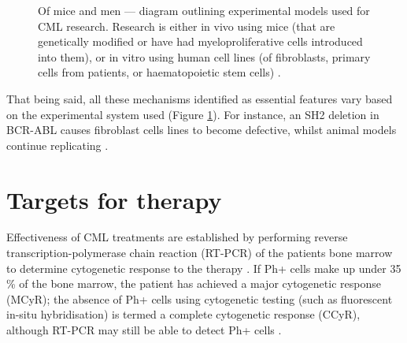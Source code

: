 \begin{figure}
{
}
\caption{Of mice and men --- diagram outlining experimental models used for CML research. Research is either in vivo using mice (that are genetically modified or have had myeloproliferative cells introduced into them), or in vitro using human cell lines (of fibroblasts, primary cells from patients, or haematopoietic stem cells) \citep{RefWorks:doc:58309926e4b05b192d72d473}.}
\label{fig:model}
\end{figure}

That being said, all these mechanisms identified as essential features vary based on the experimental system used (Figure \ref{fig:model}). For instance, an SH2 deletion in BCR-ABL causes fibroblast cells lines to become defective, whilst animal models continue replicating \citep{RefWorks:doc:5836f375e4b066125b20d252,RefWorks:doc:5836f3b2e4b09a21e93830ca}.

\section{Targets for therapy}

Effectiveness of CML treatments are established by performing reverse transcription-polymerase chain reaction (RT-PCR) of the patient\textquotesingle s bone marrow to determine cytogenetic response to the therapy \citep{RefWorks:doc:583b750ce4b04961d35942e2}. If Ph+ cells make up under 35\,\% of the bone marrow, the patient has achieved a major cytogenetic response (MCyR); the absence of Ph+ cells using cytogenetic testing (such as fluorescent in-situ hybridisation) is termed a complete cytogenetic response (CCyR), although RT-PCR may still be able to detect Ph+ cells \citep{RefWorks:doc:583b5609e4b066125b215900}.

